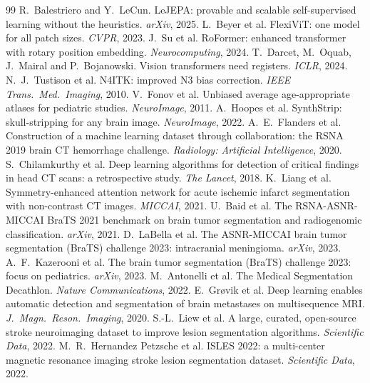 \documentclass[10pt]{article}
\begin{document}
\begin{thebibliography}{99}\small
{} R.~Balestriero and Y.~LeCun. LeJEPA: provable and scalable self-supervised learning without the heuristics. \emph{arXiv}, 2025.
 L.~Beyer et al. FlexiViT: one model for all patch sizes. \emph{CVPR}, 2023.
 J.~Su et al. RoFormer: enhanced transformer with rotary position embedding. \emph{Neurocomputing}, 2024.
 T.~Darcet, M.~Oquab, J.~Mairal and P.~Bojanowski. Vision transformers need registers. \emph{ICLR}, 2024.
 N.~J.~Tustison et al. N4ITK: improved N3 bias correction. \emph{IEEE Trans.\ Med.\ Imaging}, 2010.
 V.~Fonov et al. Unbiased average age-appropriate atlases for pediatric studies. \emph{NeuroImage}, 2011.
 A.~Hoopes et al. SynthStrip: skull-stripping for any brain image. \emph{NeuroImage}, 2022.
 A.~E.~Flanders et al. Construction of a machine learning dataset through collaboration: the RSNA 2019 brain CT hemorrhage challenge. \emph{Radiology: Artificial Intelligence}, 2020.
 S.~Chilamkurthy et al. Deep learning algorithms for detection of critical findings in head CT scans: a retrospective study. \emph{The Lancet}, 2018.
 K.~Liang et al. Symmetry-enhanced attention network for acute ischemic infarct segmentation with non-contrast CT images. \emph{MICCAI}, 2021.
 U.~Baid et al. The RSNA-ASNR-MICCAI BraTS 2021 benchmark on brain tumor segmentation and radiogenomic classification. \emph{arXiv}, 2021.
 D.~LaBella et al. The ASNR-MICCAI brain tumor segmentation (BraTS) challenge 2023: intracranial meningioma. \emph{arXiv}, 2023.
 A.~F.~Kazerooni et al. The brain tumor segmentation (BraTS) challenge 2023: focus on pediatrics. \emph{arXiv}, 2023.
 M.~Antonelli et al. The Medical Segmentation Decathlon. \emph{Nature Communications}, 2022.
 E.~Gr{\o}vik et al. Deep learning enables automatic detection and segmentation of brain metastases on multisequence MRI. \emph{J.\ Magn.\ Reson.\ Imaging}, 2020.
 S.-L.~Liew et al. A large, curated, open-source stroke neuroimaging dataset to improve lesion segmentation algorithms. \emph{Scientific Data}, 2022.
 M.~R.~Hernandez Petzsche et al. ISLES 2022: a multi-center magnetic resonance imaging stroke lesion segmentation dataset. \emph{Scientific Data}, 2022.

\end{thebibliography}
\end{document}
